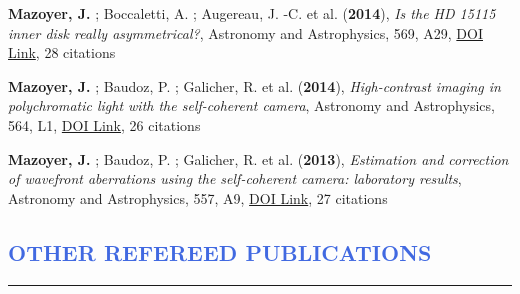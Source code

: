 \documentclass[11pt]{article}
\begin{document}
\begin{etaremune}
 \item {\bf Mazoyer, J.} ; Boccaletti, A. ; Augereau, J. -C. et al. ({\bf2014}), {\it Is the HD 15115 inner disk really asymmetrical?}, Astronomy and Astrophysics, 569, A29, \href{https://doi.org/10.1051/0004-6361/201424479}{DOI Link}, 28 citations

 \item {\bf Mazoyer, J.} ; Baudoz, P. ; Galicher, R. et al. ({\bf2014}), {\it High-contrast imaging in polychromatic light with the self-coherent camera}, Astronomy and Astrophysics, 564, L1, \href{https://doi.org/10.1051/0004-6361/201423375}{DOI Link}, 26 citations

 \item {\bf Mazoyer, J.} ; Baudoz, P. ; Galicher, R. et al. ({\bf2013}), {\it Estimation and correction of wavefront aberrations using the self-coherent camera: laboratory results}, Astronomy and Astrophysics, 557, A9, \href{https://doi.org/10.1051/0004-6361/201321706}{DOI Link}, 27 citations

 \end{etaremune}



\vspace{-0.5cm}
\textcolor{RoyalBlue}{\section{OTHER REFEREED PUBLICATIONS}
\vspace{-0.25cm}\hrule}
\vspace{0.6cm}
\end{document}
